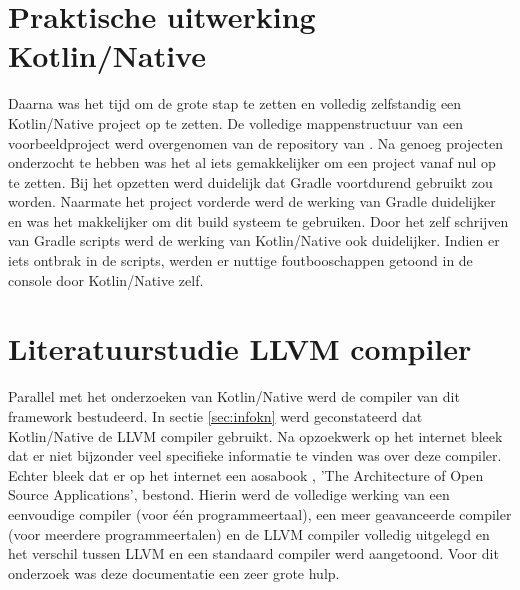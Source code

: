 \section{Praktische uitwerking Kotlin/Native}
Daarna was het tijd om de grote stap te zetten en volledig zelfstandig een Kotlin/Native project op te zetten. De volledige mappenstructuur van een voorbeeldproject werd overgenomen van de repository van \textcite{AlbertGao}. Na genoeg projecten onderzocht te hebben was het al iets gemakkelijker om een project vanaf nul op te zetten. Bij het opzetten werd duidelijk dat Gradle voortdurend gebruikt zou worden. Naarmate het project vorderde werd de werking van Gradle duidelijker en was het makkelijker om dit build systeem te gebruiken. Door het zelf schrijven van Gradle scripts werd de werking van Kotlin/Native ook duidelijker. Indien er iets ontbrak in de scripts, werden er nuttige foutbooschappen getoond in de console door Kotlin/Native zelf.

\section{Literatuurstudie LLVM compiler}
Parallel met het onderzoeken van Kotlin/Native werd de compiler van dit framework bestudeerd. In sectie \ref{sec:infokn} werd geconstateerd dat Kotlin/Native de LLVM compiler gebruikt. Na opzoekwerk op het internet bleek dat er niet bijzonder veel specifieke informatie te vinden was over deze compiler. Echter bleek dat er op het internet een aosabook \autocite{aosa}, 'The Architecture of Open Source Applications', bestond. Hierin werd de volledige werking van een eenvoudige compiler (voor één programmeertaal), een meer geavanceerde compiler (voor meerdere programmeertalen) en de LLVM compiler volledig uitgelegd en het verschil tussen LLVM en een standaard compiler werd aangetoond. Voor dit onderzoek was deze documentatie een zeer grote hulp.


